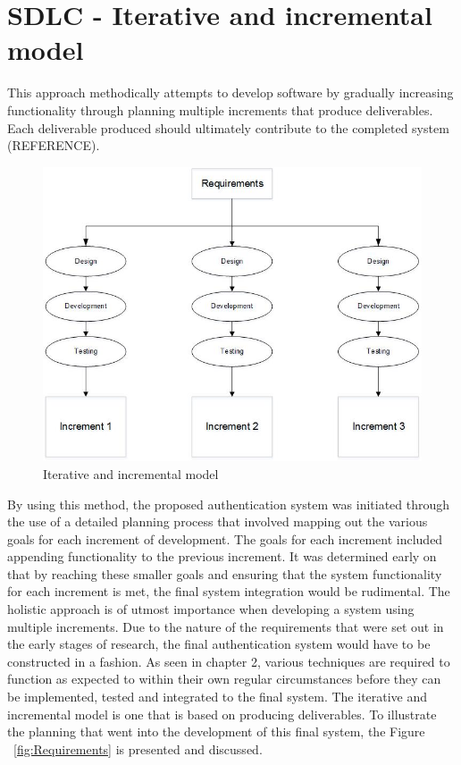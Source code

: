 \section{SDLC - Iterative and incremental model}

This approach methodically attempts to develop software by gradually increasing functionality through planning multiple increments that produce deliverables. Each deliverable produced should ultimately contribute to the completed system (REFERENCE). 


    
    \begin{figure}[htbp!] 
    \centering    
    \includegraphics[width=1.0\textwidth]{Chapter3/Figs/Iterative_and_Incremental_Model.jpg}
    \caption[Iterative and incremental model]{Iterative and incremental model}
    \label{fig:Iterative and incremental model}
    \end{figure}
    
By using this method, the proposed authentication system was initiated through the use of a detailed planning process that involved mapping out the various goals for each increment of development. The goals for each increment included appending functionality to the previous increment. It was determined early on that by reaching these smaller goals and ensuring that the system functionality for each increment is met, the final system integration would be rudimental. The holistic approach is of utmost importance when developing a system using multiple increments. Due to the nature of the requirements that were set out in the early stages of research, the final authentication system would have to be constructed in a fashion. As seen in chapter 2, various techniques are required to function as expected to within their own regular circumstances before they can be implemented, tested and integrated to the final system. 
The iterative and incremental model is one that is based on producing deliverables. To illustrate the planning that went into the development of this final system, the Figure ~\ref{fig:Requirements} is presented and discussed. 

